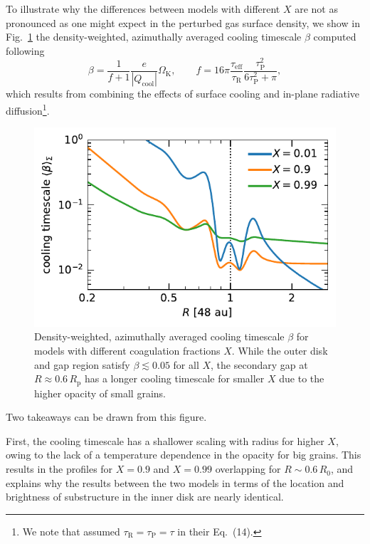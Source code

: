 \documentclass[fleqn,usenatbib,useAMS]{mnras}
\newcommand{\Rp}{R_\mathrm{p}}
\newcommand{\OmegaK}{\Omega_\mathrm{K}}
\newcommand{\tauR}{\tau_\mathrm{R}}
\newcommand{\tauP}{\tau_\mathrm{P}}
\newcommand{\taueff}{\tau_\mathrm{eff}}
\newcommand{\Qcool}{Q_\mathrm{cool}}
\begin{document}
To illustrate why the differences between models with different $X$ are not as pronounced as one might expect in the perturbed gas surface density, we show in Fig.~\ref{fig:beta} the density-weighted, azimuthally averaged cooling timescale $\beta$ computed following \citet{ziampras-etal-2023a}
%
\begin{equation}
	\label{eq:beta}
	\beta = \frac{1}{f+1}\frac{e}{|\Qcool|}\OmegaK,\qquad f=16\pi \frac{\taueff}{\tauR}\frac{\tauP^2}{6\tauP^2+\pi},
\end{equation}
%
which results from combining the effects of surface cooling and in-plane radiative diffusion\footnote[1]{We note that \citet{ziampras-etal-2023a} assumed $\tauR=\tauP=\tau$ in their Eq.~(14).}. 
%
\begin{figure}
	\centering
	\includegraphics[width=\columnwidth]{beta.pdf}
	\caption{Density-weighted, azimuthally averaged cooling timescale $\beta$ for models with different coagulation fractions $X$. While the outer disk and gap region satisfy $\beta\lesssim0.05$ for all $X$, the secondary gap at $R\approx 0.6\,\Rp$ has a longer cooling timescale for smaller $X$ due to the higher opacity of small grains.}
	\label{fig:beta}
\end{figure}
%
Two takeaways can be drawn from this figure.

First, the cooling timescale has a shallower scaling with radius for higher $X$, owing to the lack of a temperature dependence in the opacity for big grains. This results in the profiles for $X=0.9$ and $X=0.99$ overlapping for $R\sim0.6\,R_0$, and explains why the results between the two models in terms of the location and brightness of substructure in the inner disk are nearly identical.
\end{document}
